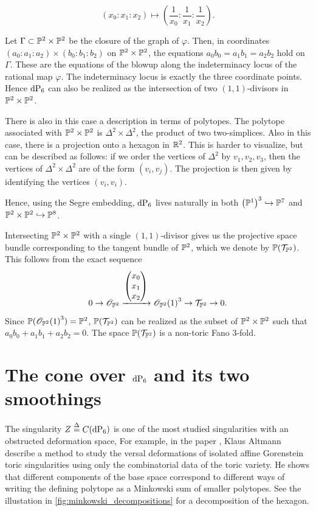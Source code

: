 \[
(x_0:x_1:x_2) \mapsto \left( \frac 1{x_0}: \frac 1{x_1}:\frac 1{x_2} \right).
\]

Let $\Gamma \subset \P^2 \times \P^2$ be the closure of the graph of $\varphi$. Then, in coordinates ${(a_0:a_1:a_2) \times(b_0:b_1:b_2)}$ on $\P^2 \times \P^2$, the equations $a_0b_0=a_1b_1=a_2b_2$ hold \label{eq:dp6_inp2p2} on $\Gamma$. These are the equations of the blowup along the indeterminacy locus of the rational map $\varphi$. The indeterminacy locus is exactly the three coordinate points. Hence $\dP6$ can also be realized as the intersection of two $(1,1)$-divisors in $\P^2 \times \P^2$. 

There is also in this case a description in terms of polytopes. The polytope associated with $\P^2 \times \P^2$ is $\Delta^2 \times \Delta^2$, the product of two two-simplices. Also in this case, there is a projection onto a hexagon in $\R^2$. This is harder to visualize, but can be described as follows: if we order the vertices of $\Delta^2$ by $v_1,v_2,v_3$, then the vertices of $\Delta^2 \times \Delta^2$ are of the form $(v_i,v_j)$. The projection is then given by identifying the vertices $(v_i,v_i)$. 

Hence, using the Segre embedding, $\dP6$ lives naturally in both ${\left( \P^1 \right)}^3 \hookrightarrow \P^7$ and $\P^2 \times \P^2 \hookrightarrow \P^8$. 

\begin{remark}
Intersecting $\P^2 \times \P^2$ with a single $(1,1)$-divisor gives us the projective space bundle corresponding to the tangent bundle of $\P^2$, which we denote by $\P(\mathcal T_{\P^2})$. This follows from the exact sequence
\[
0 \to \OO_{\P^2} \xrightarrow{\begin{pmatrix}x_0 \\ x_1 \\ x_2\end{pmatrix}} {\OO_{\P^2}(1)}^3 \to \mathcal T_{\P^2} \to 0.
\]
Since $\P({\OO_{\P^2}(1)}^3)=\P^2$,  $\P(\mathcal T_{\P^2})$ can be realized as the subset of $\P^2 \times \P^2$ such that $a_0b_0+a_1b_1+a_2b_2=0$. The space $\P(\mathcal T_{\P^2})$ is a non-toric Fano 3-fold.
\end{remark}


\section{The cone over \texorpdfstring{$\dP6$}{dP6} and its two smoothings}

The singularity $Z\stackrel{\Delta}{=} C(\dP6)$ is one of the most studied singularities with an obstructed deformation space, For example, in the paper \cite{altmann_versaldeformation}, Klaus Altmann describe a method to study the versal deformations of isolated affine Gorenstein toric singularities using only the combinatorial data of the toric variety. He shows that different components of the base space correspond to different ways of writing the defining polytope as a Minkowski sum of smaller polytopes. See the illustation in \cref{fig:minkowski_decompositions} for a decomposition of the hexagon.

